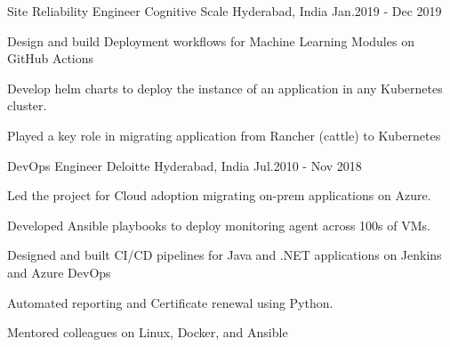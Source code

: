 \begin{cventries}
\vspace{1\baselineskip}
  \cventry
    { Site Reliability Engineer } %
    {Cognitive Scale} %
    {Hyderabad, India} %
    {Jan.2019 - Dec 2019 } %
    {
      \begin{cvitems} %
        \item {Design and build Deployment workflows for Machine Learning Modules on GitHub Actions}
        \item {Develop helm charts to deploy the instance of an application in any Kubernetes cluster. }
        \item { Played a key role in migrating application from Rancher (cattle) to Kubernetes }
      \end{cvitems}
    }
\vspace{1\baselineskip}
  \cventry
    { DevOps Engineer } %
    {Deloitte} %
    {Hyderabad, India} %
    {Jul.2010 -  Nov 2018 } %
    {
      \begin{cvitems} %
        \item {Led the project for Cloud adoption migrating on-prem applications on Azure.}
        \item {Developed Ansible playbooks to deploy monitoring agent across 100s of VMs.}
        \item {Designed and built CI/CD pipelines for Java and .NET applications on Jenkins and Azure DevOps}   
        \item {Automated reporting and Certificate renewal using Python.}
        \item {Mentored colleagues on Linux, Docker, and Ansible}
      \end{cvitems}
    }

\end{cventries}
